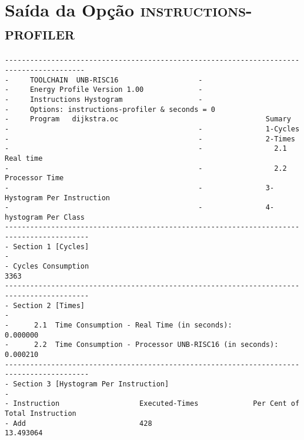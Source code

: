 \section{Saída da Opção \textsc{instructions-profiler}}
\scriptsize
\begin{verbatim}
-----------------------------------------------------------------------------------------
-     TOOLCHAIN  UNB-RISC16                   -                                          
-     Energy Profile Version 1.00             -                                            
-     Instructions Hystogram                  -                                            
-     Options: instructions-profiler & seconds = 0
-     Program   dijkstra.oc                                   Sumary   
-                                             -               1-Cycles                     
-                                             -               2-Times                      
-                                             -                 2.1    Real time           
-                                             -                 2.2    Processor Time      
-                                             -               3-Hystogram Per Instruction  
-                                             -               4-hystogram Per Class        
------------------------------------------------------------------------------------------
- Section 1 [Cycles]                                                                      
-                                                                                         
- Cycles Consumption                                                   3363                 
------------------------------------------------------------------------------------------
- Section 2 [Times]                                                                       
-                                                                                         
-      2.1  Time Consumption - Real Time (in seconds):                0.000000                 
-      2.2  Time Consumption - Processor UNB-RISC16 (in seconds):     0.000210                 
------------------------------------------------------------------------------------------
- Section 3 [Hystogram Per Instruction]                                                   
-                                                                                         
- Instruction                   Executed-Times             Per Cent of Total Instruction  
- Add                           428                            13.493064                        

\end{verbatim}
